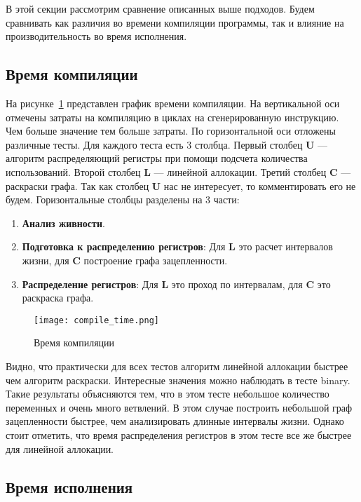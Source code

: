 В этой секции рассмотрим сравнение описанных выше подходов. \cite{poletto1999}
Будем сравнивать как различия во времени компиляции программы,
так и влияние на производительность во время исполнения.

\subsection{Время компиляции}

На рисунке~\ref{fig:compile_bench} представлен график времени компиляции.
На вертикальной оси отмечены затраты на компиляцию в циклах на сгенерированную инструкцию.
Чем больше значение тем больше затраты.
По горизонтальной оси отложены различные тесты.
Для каждого теста есть 3 столбца.
Первый столбец \textbf{U} --- алгоритм распределяющий регистры при помощи подсчета количества использований.
Второй столбец \textbf{L} --- линейной аллокации.
Третий столбец \textbf{C} --- раскраски графа.
Так как столбец \textbf{U} нас не интересует, то комментировать его не будем.
Горизонтальные столбцы разделены на 3 части:

\begin{enumerate}
	\item \textbf{Анализ живности}.

	\item \textbf{Подготовка к распределению регистров}: Для \textbf{L} это расчет интервалов жизни,
	для \textbf{C} построение графа зацепленности.
	
	\item \textbf{Распределение регистров}: Для \textbf{L} это проход по интервалам, для \textbf{C} это раскраска графа.
\end{enumerate}

\begin{figure}[h]
	\texttt{[image: compile\_time.png]}
	\caption{Время компиляции}
	\label{fig:compile_bench}
\end{figure}

Видно, что практически для всех тестов алгоритм линейной аллокации быстрее чем алгоритм раскраски.
Интересные значения можно наблюдать в тесте binary.
Такие результаты объясняются тем, что в этом тесте небольшое количество переменных и очень много ветвлений.
В этом случае построить небольшой граф зацепленности быстрее, чем анализировать длинные интервалы жизни.
Однако стоит отметить, что время распределения регистров в этом тесте все же быстрее для линейной аллокации.

\subsection{Время исполнения}

